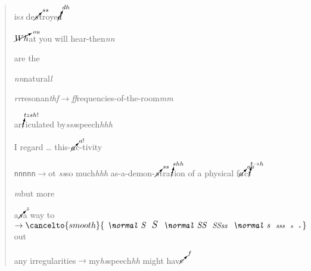 \begin{quote}
is\textit{s} de$\cancelto{ss}{s}$troye$\cancelto{dh}{d}$\par
\par\par
$\cancelto{ou}{Wh}$at you will hear-then\textit{nn} \par
{}
are the\par
\quad \textit{nn}natural\textit{l}\par
\quad \quad \textit{rr}resonan\textit{thf$\rightarrow$ff}requencies-of-the-room\textit{mm}\par
ar$\cancelto{tzsh!}{t}$iculated by\textit{sss}speech\textit{hhh} \par
I regard \dots{} this-$\cancelto{a!}{a}$c-tivity\par
{}
\texttt{nnnnn$\rightarrow$}ot \textit{ss}so much\textit{hhh} as-a-demon-$\cancelto{ss}{s}$tra$\cancelto{shh}{t}$ion of a physical f$\cancelto{aa}{a}$c$\cancelto{t\rightarrow h}{t}$\par
{}
\textit{m}but more\par
{}
a$\cancelto{z}{s}$a way {} to$\rightarrow\cancelto{smooth}{\textit{{ \normal S }{ \large S }{ \normal SS }{ \small SSss }{ \normal s }{ \footnotesize sss  }{ \scriptsize s  }{ \tiny s }}}$ \normal out \par
any irregularities$\rightarrow$my\textit{h}\textit{s}speech\textit{hh} might hav$\cancelto{f}{e}$
\end{quote}
